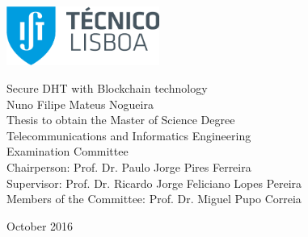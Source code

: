 \thispagestyle {empty}

\includegraphics[width=5.0cm]{Logo.png}

\begin{center}
%

\vspace{0.8cm}
{\FontLb Secure DHT with Blockchain technology} \\
\vspace{2.6cm}
{\FontMb Nuno Filipe Mateus Nogueira} \\
\vspace{1.9cm}
{\FontLn Thesis to obtain the Master of Science Degree} \\
\vspace{0.3cm}
{\FontLb Telecommunications and Informatics Engineering} \\
\vspace{1.9cm}
{\FontMb Examination Committee} \\
\vspace{0.3cm}
{\FontSn %
  Chairperson:        Prof. Dr. Paulo Jorge Pires Ferreira \\
Supervisor:        Prof. Dr. Ricardo Jorge Feliciano Lopes Pereira \\
Members of the Committee:            Prof. Dr. Miguel Pupo Correia \\
}
\vspace{1.5cm}

{\FontMb October 2016} \\
%
\end{center}

\cleardoublepage

\restoregeometry
